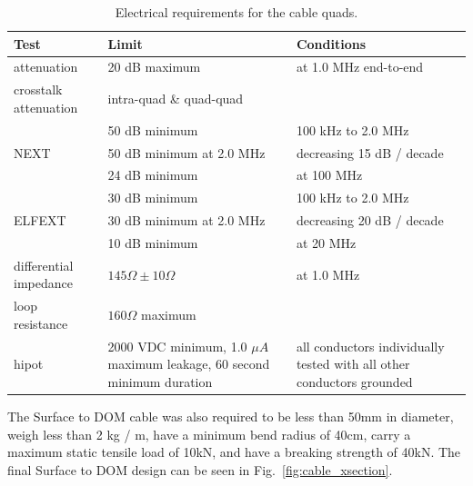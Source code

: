 \begin{table}[h]
  \centering
  \begin{tabularx}{\textwidth}{| l | X | X | }
    \hline
    \bf{Test} & \bf{Limit} & \bf{Conditions} \\
    \hline

    attenuation & 20 dB maximum & at 1.0 MHz end-to-end \\
    \hline

    crosstalk attenuation & intra-quad \& quad-quad & \\
    \hline

    & 50 dB minimum & 100 kHz to 2.0 MHz \\
    \cline {2-3}
    NEXT & 50 dB minimum at 2.0 MHz & decreasing 15 dB / decade \\
    \cline {2-3}
    & 24 dB minimum & at 100 MHz \\
    \hline

    & 30 dB minimum & 100 kHz to 2.0 MHz \\
    \cline {2-3}
    ELFEXT & 30 dB minimum at 2.0 MHz & decreasing 20 dB / decade \\
    \cline {2-3}
    & 10 dB minimum & at 20 MHz \\
    \hline

    differential impedance & $145\Omega \pm 10\Omega$ & at 1.0 MHz \\
    \hline

    loop resistance & $160\Omega$ maximum & \\
    \hline

    hipot & 2000 VDC minimum, 1.0 $\mu A$ maximum leakage, 60 second
    minimum duration & all conductors individually tested with all other
    conductors grounded \\
    \hline    
  \end{tabularx}
  \caption{Electrical requirements for the cable quads.} 
  \label{tab:quad_requirements}
\end{table}

The Surface to DOM cable was also required to be less than 50mm in
diameter, weigh less than 2 kg / m, have a minimum bend radius of 40cm,
carry a maximum static tensile load of 10kN, and have a breaking strength
of 40kN. The final Surface to DOM design can be seen in
Fig.~\ref{fig:cable_xsection}. 


